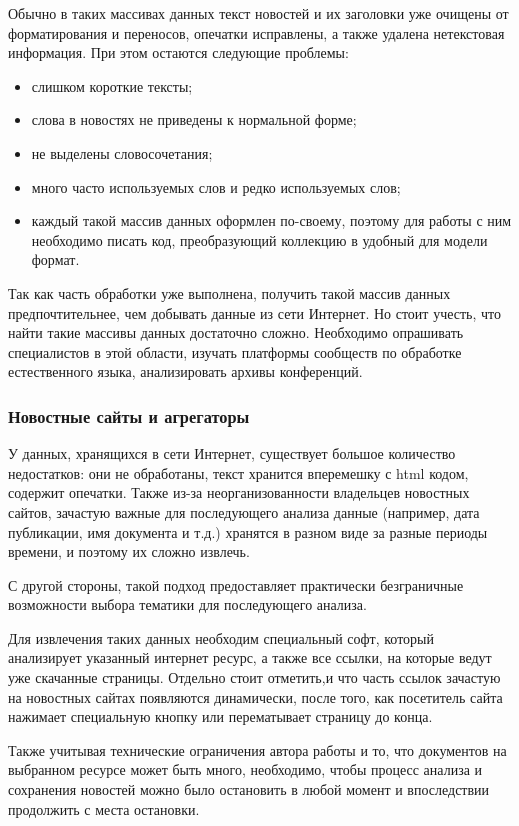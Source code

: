 Обычно в таких массивах данных текст новостей и их заголовки уже очищены от форматирования и переносов, опечатки исправлены, а также удалена нетекстовая информация. При этом остаются следующие проблемы:

\begin{itemize}
    \item слишком короткие тексты;
    \item слова в новостях не приведены к нормальной форме;
    \item не выделены словосочетания;
    \item много часто используемых слов и редко используемых слов;
    \item каждый такой массив данных оформлен по-своему, поэтому для работы с ним необходимо писать код, преобразующий коллекцию в удобный для модели формат.
\end{itemize}
 

Так как часть обработки уже выполнена, получить такой массив данных предпочтительнее, чем добывать данные из сети Интернет. Но стоит учесть, что найти такие массивы данных достаточно сложно. Необходимо опрашивать специалистов в этой области, изучать платформы сообществ по обработке естественного языка, анализировать архивы конференций.

%
\subsubsection{Новостные сайты и агрегаторы}

У данных, хранящихся в сети Интернет, существует большое количество недостатков: они не обработаны, текст хранится вперемешку с html кодом, содержит опечатки. Также из-за неорганизованности владельцев новостных сайтов, зачастую важные для последующего анализа данные (например, дата публикации, имя документа и т.д.) хранятся в разном виде за разные периоды времени, и поэтому их сложно извлечь. 

С другой стороны, такой подход предоставляет практически безграничные возможности выбора тематики для последующего анализа.

Для извлечения таких данных необходим специальный софт, который анализирует указанный интернет ресурс, а также все ссылки, на которые ведут уже скачанные страницы. Отдельно стоит отметить,и что часть ссылок зачастую на новостных сайтах появляются динамически, после того, как посетитель сайта нажимает специальную кнопку или перематывает страницу до конца.

Также учитывая технические ограничения автора работы и то, что документов на выбранном ресурсе может быть много, необходимо, чтобы процесс анализа и сохранения новостей можно было остановить в любой момент и впоследствии продолжить с места остановки.

